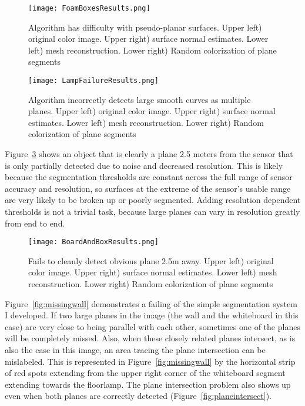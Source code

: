 \begin{figure}[!htpb]
    \centering
    \texttt{[image: FoamBoxesResults.png]}
    \caption{Algorithm has difficulty with pseudo-planar surfaces. Upper left) original color image. Upper right) surface normal estimates. Lower left) mesh reconstruction. Lower right) Random colorization of plane segments}
    \label{fig:foamboxes}
\end{figure}

\begin{figure}[!htpb]
    \centering
    \texttt{[image: LampFailureResults.png]}
    \caption{Algorithm incorrectly detects large smooth curves as multiple planes. Upper left) original color image. Upper right) surface normal estimates. Lower left) mesh reconstruction. Lower right) Random colorization of plane segments}
    \label{fig:lampcurve}
\end{figure}

Figure~\ref{fig:distantsmallplane} shows an object that is clearly a plane 2.5 meters from the sensor that is only partially detected due to noise and decreased resolution. This is likely because the segmentation thresholds are constant across the full range of sensor accuracy and resolution, so surfaces at the extreme of the sensor's usable range are very likely to be broken up or poorly segmented. Adding resolution dependent thresholds is not a trivial task, because large planes can vary in resolution greatly from end to end.

\begin{figure}[!htpb]
    \centering
    \texttt{[image: BoardAndBoxResults.png]}
    \caption{Fails to cleanly detect obvious plane 2.5m away. Upper left) original color image. Upper right) surface normal estimates. Lower left) mesh reconstruction. Lower right) Random colorization of plane segments}
    \label{fig:distantsmallplane}
\end{figure}

Figure~\ref{fig:missingwall} demonstrates a failing of the simple segmentation system I developed. If two large planes in the image (the wall and the whiteboard in this case) are very close to being parallel with each other, sometimes one of the planes will be completely missed. Also, when these closely related planes intersect, as is also the case in this image, an area tracing the plane intersection can be mislabeled. This is represented in Figure~\ref{fig:missingwall} by the horizontal strip of red spots extending from the upper right corner of the whiteboard segment extending towards the floorlamp. The plane intersection problem also shows up even when both planes are correctly detected (Figure~\ref{fig:planeintersect}).



